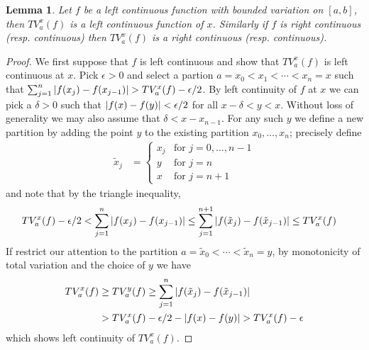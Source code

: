 \documentclass{amsart}
\newtheorem{lem}[thm]{Lemma}
\theoremstyle{remark}
\theoremstyle{definition}
\begin{document}
\begin{lem}\label{ContinuityOfTotalVariation}Let $f$ be a left
  continuous function with bounded variation on $[a,b]$, then
  $TV_a^x(f)$ is a left continuous function of $x$.  Similarly if $f$
  is right continuous (resp. continuous) then  $TV_a^x(f)$ is a right
  continuous (resp. continuous).
\end{lem}
\begin{proof}
We first suppose that $f$ is left continuous and show that $TV_a^x(f)$
is left continuous at $x$.  Pick $\epsilon > 0$ and select a partion
$a=x_0 < x_1 < \dotsb < x_n=x$ such that $\sum_{j=1}^n \left \vert f(x_j) -
  f(x_{j-1}) \right \vert > TV_a^x(f) - \epsilon/2$.  By left continuity of $f$ at $x$
we can pick a $\delta>0$ such that $\left \vert f(x) - f(y) \right \vert < \epsilon/2$
for all $x-\delta < y < x$. Without loss of generality we may also
assume that $\delta < x - x_{n-1}$.  For any such $y$ we
define a new partition by adding the point $y$ to the existing
partition $x_0, \dotsc, x_n$; precisely define 
\begin{align*}
\tilde{x}_j &= \begin{cases}
x_j & \text{for $j=0, \dotsc, n-1$} \\
y & \text{for $j=n$} \\
x & \text{for $j=n+1$}
\end{cases}
\end{align*}
and note that by the triangle inequality, 
\begin{align*}
TV_a^x(f) - \epsilon/2 &< \sum_{j=1}^n \left \vert f(x_j) -
  f(x_{j-1}) \right \vert \leq \sum_{j=1}^{n+1} \left \vert f(\tilde{x}_j) -
  f(\tilde{x}_{j-1}) \right \vert \leq TV_a^x(f)
\end{align*}
If restrict our attention to the partition $a = \tilde{x}_0 < \dotsb <
\tilde{x}_n = y$, by monotonicity of total variation and the choice of $y$ we have
\begin{align*}
TV_a^x(f) &\geq TV_a^y(f) \geq \sum_{j=1}^{n} \left \vert f(\tilde{x}_j) -
  f(\tilde{x}_{j-1}) \right \vert \\
&> TV_a^x(f) - \epsilon/2 - \left \vert f(x) - f(y) \right \vert > TV_a^x(f) - \epsilon
\end{align*}
which shows left continuity of $TV_a^x(f)$.


\end{proof}
\end{document}
